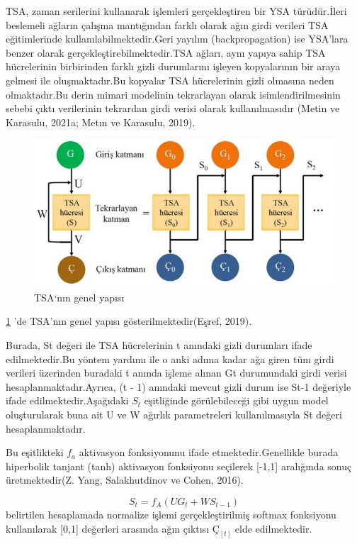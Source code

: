 \documentclass[12pt,twoside]{deuthesis}
\begin{document}
TSA, zaman serilerini kullanarak işlemleri gerçekleştiren bir YSA türüdür.İleri beslemeli ağların çalışma mantığından farklı olarak ağın girdi verileri TSA eğitimlerinde kullanılabilmektedir.Geri yayılım (backpropagation) ise YSA'lara benzer olarak gerçekleştirebilmektedir.TSA ağları, aynı yapıya sahip TSA hücrelerinin birbirinden farklı gizli durumlarını işleyen kopyalarının bir araya gelmesi ile oluşmaktadır.Bu kopyalar TSA hücrelerinin gizli olmasına neden olmaktadır.Bu derin mimari modelinin tekrarlayan olarak isimlendirilmesinin sebebi çıktı verilerinin tekrardan girdi verisi olarak kullanılmasıdır (Metin ve Karasulu, 2021a; Metın ve Karasulu, 2019).
\begin{figure}

{\centering \includegraphics[width=1\linewidth,height=0.27\textheight]{figure/rnn_1} 

}

\caption{TSA‘nın genel yapısı}\label{fig:ysa4}
\end{figure}
\ref{fig:ysa4} 'de TSA'nın genel yapısı gösterilmektedir(Eşref, 2019).

Burada, St değeri ile TSA hücrelerinin t anındaki gizli durumları ifade edilmektedir.Bu yöntem yardımı ile o anki adıma kadar ağa giren tüm girdi verileri üzerinden buradaki t anında işleme alınan Gt durumundaki girdi verisi hesaplanmaktadır.Ayrıca, (t - 1) anındaki mevcut gizli durum ise St-1 değeriyle ifade edilmektedir.Aşağıdaki \(S_{t}\) eşitliğinde görülebileceği gibi uygun model oluşturularak buna ait U ve W ağırlık parametreleri kullanılmasıyla St değeri hesaplanmaktadır.

Bu eşitlikteki \(f_{a}\) aktivasyon fonksiyonunu ifade etmektedir.Genellikle burada hiperbolik tanjant (tanh) aktivasyon fonksiyonu seçilerek {[}-1,1{]} aralığında sonuç üretmektedir(Z. Yang, Salakhutdinov ve Cohen, 2016).

\[ S_{t} = f_{A}(UG_{t}+WS_{t-1})\]
belirtilen hesaplamada normalize işlemi gerçekleştirilmiş softmax fonksiyonu kullanılarak {[}0,1{]} değerleri arasında ağın çıktısı \({Ç_[t]}\) elde edilmektedir.
\end{document}
